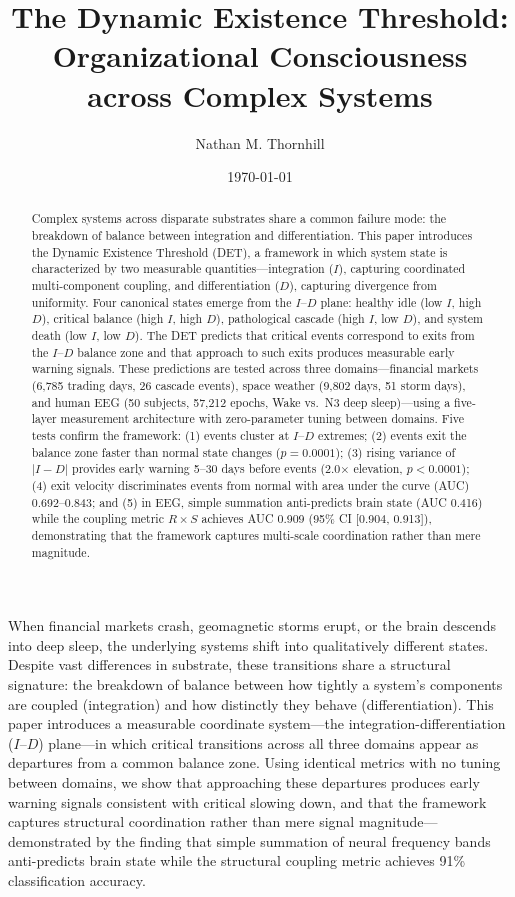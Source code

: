 \documentclass[aip,cha,reprint,amsmath,amssymb]{revtex4-2}
\title{The Dynamic Existence Threshold: Organizational Consciousness across Complex Systems}
\author{Nathan M. Thornhill}
\affiliation{Independent Researcher, Fort Wayne, Indiana 46802, USA}
\date{\today}
\begin{document}
\begin{abstract}
Complex systems across disparate substrates share a common failure mode: the breakdown of balance between integration and differentiation. This paper introduces the Dynamic Existence Threshold (DET), a framework in which system state is characterized by two measurable quantities---integration ($I$), capturing coordinated multi-component coupling, and differentiation ($D$), capturing divergence from uniformity. Four canonical states emerge from the $I$--$D$ plane: healthy idle (low $I$, high $D$), critical balance (high $I$, high $D$), pathological cascade (high $I$, low $D$), and system death (low $I$, low $D$). The DET predicts that critical events correspond to exits from the $I$--$D$ balance zone and that approach to such exits produces measurable early warning signals. These predictions are tested across three domains---financial markets (6,785 trading days, 26 cascade events), space weather (9,802 days, 51 storm days), and human EEG (50 subjects, 57,212 epochs, Wake vs.\ N3 deep sleep)---using a five-layer measurement architecture with zero-parameter tuning between domains. Five tests confirm the framework: (1) events cluster at $I$--$D$ extremes; (2) events exit the balance zone faster than normal state changes ($p = 0.0001$); (3) rising variance of $|I - D|$ provides early warning 5--30 days before events (2.0$\times$ elevation, $p < 0.0001$); (4) exit velocity discriminates events from normal with area under the curve (AUC) 0.692--0.843; and (5) in EEG, simple summation anti-predicts brain state (AUC 0.416) while the coupling metric $R \times S$ achieves AUC 0.909 (95\% CI [0.904, 0.913]), demonstrating that the framework captures multi-scale coordination rather than mere magnitude.
\end{abstract}


\maketitle

When financial markets crash, geomagnetic storms erupt, or the brain descends into deep sleep, the underlying systems shift into qualitatively different states. Despite vast differences in substrate, these transitions share a structural signature: the breakdown of balance between how tightly a system's components are coupled (integration) and how distinctly they behave (differentiation). This paper introduces a measurable coordinate system---the integration-differentiation ($I$--$D$) plane---in which critical transitions across all three domains appear as departures from a common balance zone. Using identical metrics with no tuning between domains, we show that approaching these departures produces early warning signals consistent with critical slowing down, and that the framework captures structural coordination rather than mere signal magnitude---demonstrated by the finding that simple summation of neural frequency bands anti-predicts brain state while the structural coupling metric achieves 91\% classification accuracy.
\end{document}
